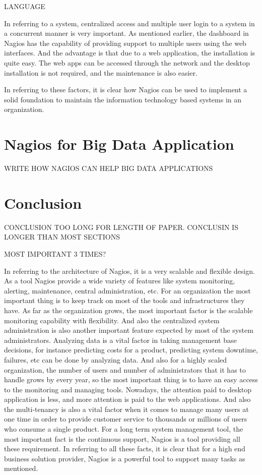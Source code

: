 \documentclass[9pt,twocolumn,twoside]{styles/osajnl}
\begin{document}
LANGUAGE

In referring to a system, centralized access and multiple user login
to a system in a concurrent manner is very important. As mentioned
earlier, the dashboard in Nagios has the capability of providing
support to multiple users using the web interfaces. And the advantage
is that due to a web application, the installation is quite easy. The
web apps can be accessed through the network and the desktop
installation is not required, and the maintenance is also easier.

In referring to these factors, it is clear how Nagios can be used to
implement a solid foundation to maintain the information technology
based systems in an organization.

\section{Nagios for Big Data Application}

WRITE HOW NAGIOS CAN HELP BIG DATA APPLICATIONS

\section{Conclusion}

CONCLUSION TOO LONG FOR LENGTH OF PAPER. CONCLUSIN IS LONGER THAN MOST
SECTIONS

MOST IMPORTANT 3 TIMES?

In referring to the architecture of Nagios, it is a very scalable and
flexible design. As a tool Nagios provide a wide variety of features
like system monitoring, alerting, maintenance, central administration,
etc. For an organization the most important thing is to keep track on
most of the tools and infrastructures they have. As far as the
organization grows, the most important factor is the scalable
monitoring capability with flexibility. And also the centralized
system administration is also another important feature expected by
most of the system administrators. Analyzing data is a vital factor in
taking management base decisions, for instance predicting costs for a
product, predicting system downtime, failures, etc can be done by
analyzing data. And also for a highly scaled organization, the number
of users and number of administrators that it has to handle grows by
every year, so the most important thing is to have an easy access to
the monitoring and managing tools. Nowadays, the attention paid to
desktop application is less, and more attention is paid to the web
applications. And also the multi-tenancy is also a vital factor when
it comes to manage many users at one time in order to provide customer
service to thousands or millions of users who consume a single
product. For a long term system management tool, the most important
fact is the continuous support, Nagios is a tool providing all these
requirement. In referring to all these facts, it is clear that for a
high end business solution provider, Nagios is a powerful tool to
support many tasks as mentioned.




 
\end{document}
